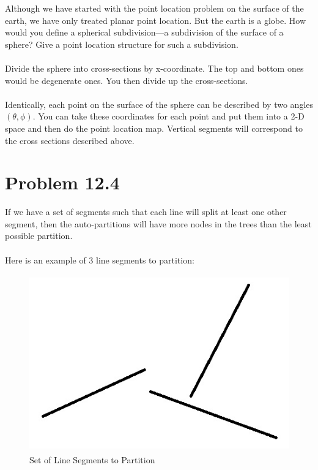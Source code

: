\documentclass[11pt,psfig]{article}
\begin{document}
 Although we have started with the point location problem on the surface
of the earth, we have only treated planar point location. But the earth is
a globe. How would you define a spherical subdivision—a subdivision
of the surface of a sphere? Give a point location structure for such a
subdivision.\\
\\
Divide the sphere into cross-sections by x-coordinate. The top and bottom ones would be degenerate ones. You then divide up the cross-sections. \\
\\
Identically, each point on the surface of the sphere can be described by two angles $(\theta,\phi)$. You can take these coordinates for each point and put them into a 2-D space and then do the point location map. Vertical segments will correspond to the cross sections described above. 

\newpage

\section*{Problem 12.4}

If we have a set of segments such that each line will split at least one other segment, then the auto-partitions will have more nodes in the trees than the least possible partition. \\
\\
Here is an example of 3 line segments to partition:
\begin{figure}[H]
\centering
\includegraphics[height=3in]{hw6prob3diagram1.jpg}
\caption{Set of Line Segments to Partition}
\end{figure}
\end{document}
